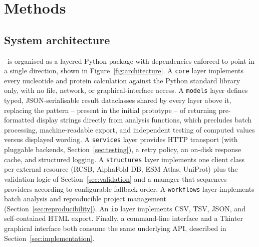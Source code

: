 \section{Methods}
\label{sec:methods}

\subsection{System architecture}
\label{sec:architecture}

\bsi\ is organised as a layered Python package with dependencies enforced
to point in a single direction, shown in Figure~\ref{fig:architecture}. A
\texttt{core} layer implements every nucleotide and protein calculation
against the Python standard library only, with no file, network, or
graphical-interface access. A \texttt{models} layer defines typed,
JSON-serialisable result dataclasses shared by every layer above it,
replacing the pattern -- present in the initial prototype -- of returning
pre-formatted display strings directly from analysis functions, which
precludes batch processing, machine-readable export, and independent testing
of computed values versus displayed wording. A \texttt{services} layer
provides HTTP transport (with pluggable backends, Section~\ref{sec:testing}),
a retry policy, an on-disk response cache, and structured logging. A
\texttt{structures} layer implements one client class per external resource
(RCSB, AlphaFold DB, ESM Atlas, UniProt) plus the validation logic of
Section~\ref{sec:validation} and a manager that sequences providers
according to configurable fallback order. A \texttt{workflows} layer
implements batch analysis and reproducible project management
(Section~\ref{sec:reproducibility}). An \texttt{io} layer implements CSV,
TSV, JSON, and self-contained HTML export. Finally, a command-line interface
and a Tkinter graphical interface both consume the same underlying API,
described in Section~\ref{sec:implementation}.


